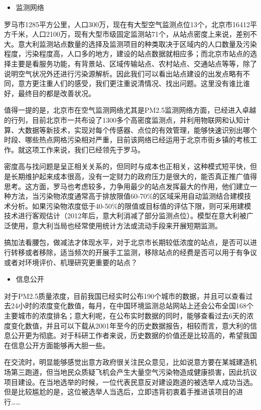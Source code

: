 \documentclass[]{book}
\providecommand{\tightlist}{%
  \setlength{\itemsep}{0pt}\setlength{\parskip}{0pt}}
\begin{document}
\begin{itemize}
\tightlist
\item
  监测网络
\end{itemize}

罗马市1285平方公里，人口300万，现在有大型空气监测点位13个，北京市16412平方千米，人口2100万，现有大型市级固定监测站71个，从站点密度上来说，差别不大。意大利监测站点数量的选择及监测项目的种类取决于区域内的人口数量及污染程度，污染程度高，人口多的地方，建设的站点数据就相应多；而北京市站点的选择主要是看服务功能，有背景站、区域传输站点、农村站点、交通站点等等，除了说明空气状况外还进行污染源解析。因此我们可以看出站点建设的出发点略有不同，意方更注重人们的感受，我们更注重说清情况、找出问题。这里没有谁比谁好，最终目的都是改善状况。

值得一提的是，北京市在空气监测网络尤其是PM2.5监测网络方面，已经进入卓越的行列，目前北京市一共布设了1300多个高密度监测点，并利用物联网和认知计算、大数据等新技术，实现对每个传感器、点位的有效管理，能够快速识别出哪个时段、哪些热点网格污染相对严重，目前该网络已经运用于北京市街乡镇的考核工作。就这项工作来说，我们已经领先于罗马。

密度高与找问题是呈正相关关系的，但同时与成本也正相关，这种模式短平快，但是长期维护起来成本很高，没有一定财力的政府压力是很大的，能否真正推广值得思考。这方面，罗马也考虑较多，力争用最少的站点发挥最大的作用，他们建立一种方法，当污染物浓度通常高于排放限值60-70\%的区域采用自动监测结合建模技术分析。如果污染物浓度低于40-50\%的限值或目标值的评估下限，则可采用建模技术进行客观估计（2012年后，意大利消减了部分监测点位）。模型在意大利被广泛使用，意大利当局也经常使用统计方法或流动手段来开展短期监测。

搞加法看腰包，做减法才体现水平，对于北京市长期较低浓度的站点，是否可以进行转移或者移除，适当频次的开展手工监测，移除站点的经费是否可以用于有争议或者对环境评价、机理研究更重要的站点？

\begin{itemize}
\tightlist
\item
  信息公开
\end{itemize}

对于PM2.5质量浓度，目前我国已经实时公布190个城市的数据，并且可以查看过去24小时的浓度变化数值，每月，在中国环境监测总站网站上还会公布全国168个主要城市的浓度排名；意大利呢，在公布实时数据的同时，能够查看过去6天的浓度变化数值，并且可以下载从2001年至今的历史数据报告，相较而言，意大利的信息公开更为彻底。对于科研工作者来说，历史数据的价值还是比较高的，希望我国在信息公开方面能够再大胆一些。

在交流时，明显能够感觉出意方政府很关注民众意见，比如说意方要在某城建造机场第三跑道，但当地民众质疑飞机会产生大量空气污染物造成健康损害，因此抗议项目建设。在当地选举的时候，一位代表民意反对建设跑道的被选举人成功当选。但是比较尴尬的是，这位被选举人当选后，立即违背初衷着手推进该项目的进行\ldots{}\ldots{}
\end{document}
